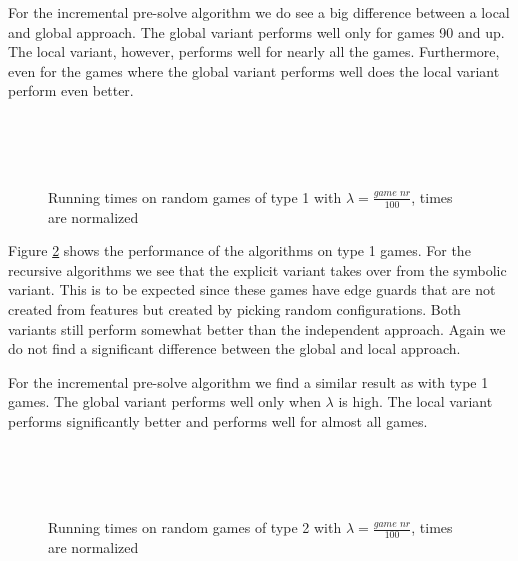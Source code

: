 For the incremental pre-solve algorithm we do see a big difference between a local and global approach. The global variant performs well only for games 90 and up. The local variant, however, performs well for nearly all the games. Furthermore, even for the games where the global variant performs well does the local variant perform even better.
\begin{figure}[H]
	\centering
	\begin{multicols}{2}
		\\
		\\
		\\
		
	\end{multicols}
	\caption{Running times on random games of type 1 with $\lambda = \frac{\textit{game nr}}{100}$, times are normalized}
	\label{fig:results_type1}
\end{figure}%


Figure \ref{fig:results_type2} shows the performance of the algorithms on type 1 games. For the recursive algorithms we see that the explicit variant takes over from the symbolic variant. This is to be expected since these games have edge guards that are not created from features but created by picking random configurations. Both variants still perform somewhat better than the independent approach. Again we do not find a significant difference between the global and local approach.

For the incremental pre-solve algorithm we find a similar result as with type 1 games. The global variant performs well only when $\lambda$ is high. The local variant performs significantly better and performs well for almost all games.
\begin{figure}[H]
	\centering
	\begin{multicols}{2}
		\\
		\\
		\\
		
	\end{multicols}
	\caption{Running times on random games of type 2 with $\lambda = \frac{\textit{game nr}}{100}$, times are normalized}
	\label{fig:results_type2}
\end{figure}%

